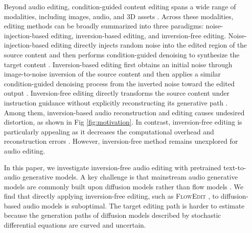 Beyond audio editing, condition-guided content editing spans a wide range of modalities, including images, audio, and 3D assets \citep{shuai2024survey, huang2025diffusion, lu2024advances}. Across these modalities, editing methods can be broadly summarized into three paradigms: noise-injection-based editing, inversion-based editing, and inversion-free editing. 
Noise-injection-based editing directly injects random noise into the edited region of the source content and then performs condition-guided denoising to synthesize the target content \citep{meng2021sdedit}. 
Inversion-based editing first obtains an initial noise through image-to-noise inversion of the source content and then applies a similar condition-guided denoising process from the inverted noise toward the edited output \citep{10205188, huberman2024edit}.
Inversion-free editing directly transforms the source content under instruction guidance without explicitly reconstructing its generative path \citep{kulikov2025flowedit}. 
Among them, inversion-based audio reconstruction and editing causes undesired distortion, as shown in Fig \ref{fig:motivation}. 
In contrast, inversion-free editing is particularly appealing as it decreases the computational overhead and reconstruction errors \citep{kim2025flowalign, dao2026steerflow}. 
However, inversion-free method remains unexplored for audio editing.

In this paper, we investigate inversion-free audio editing with pretrained text-to-audio generative models. A key challenge is that mainstream audio generative models are commonly built upon diffusion models rather than flow models \citep{majumder2024tango, liu2024audioldm}. We find that directly applying inversion-free editing, such as \textsc{FlowEdit} \citep{kulikov2025flowedit}, to diffusion-based audio models is suboptimal. The target editing path is harder to estimate because the generation paths of diffusion models described by stochastic differential equations are curved and uncertain. 

